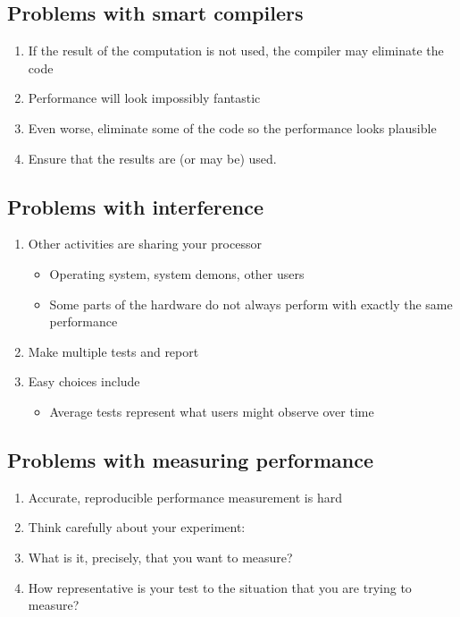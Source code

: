 \noindent
\subsection*{Problems with smart compilers}

\begin{enumerate}
\item If the result of the computation is not used, the compiler may eliminate the code

\item Performance will look impossibly fantastic

\item Even worse, eliminate some of the code so the performance looks plausible

\item Ensure that the results are (or may be) used.
\end{enumerate}

\noindent
\subsection*{Problems with interference}
\begin{enumerate}
\item Other activities are sharing your processor
\begin{itemize}

  \item Operating system, system demons, other users

  \item Some parts of the hardware do not always perform with exactly the same performance

\end{itemize}

\noindent
\item Make multiple tests and report

\item Easy choices include
\begin{itemize}

  \item Average tests represent what users might observe over time
\end{itemize}

\noindent
\end{enumerate}

\noindent
\subsection*{Problems with measuring performance}
\begin{enumerate}
\item Accurate, reproducible performance measurement is hard

\item Think carefully about your experiment:

\item What is it, precisely, that you want to measure?

\item How representative is your test to the situation that you are trying to measure?
\end{enumerate}

